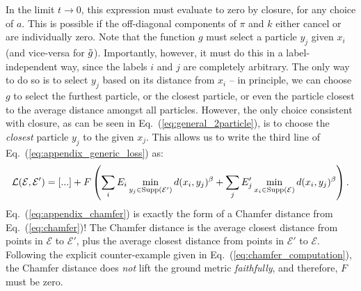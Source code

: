 \documentclass[letterpaper,11pt]{article}
\newcommand{\E}{\mathcal{E}}
\DeclareRobustCommand{\Eq}[1]{Eq.~(\ref{eq:#1})}
\begin{document}
In the limit $t\to0$, this expression must evaluate to zero by closure, for any choice of $a$. This is possible if the off-diagonal components of $\pi$ and $k$ either cancel or are individually zero. Note that the function $g$ must select a particle $y_j$ given $x_i$ (and vice-versa for $\Tilde{g}$). Importantly, however, it must do this in a label-independent way, since the labels $i$ and $j$ are completely arbitrary. The only way to do so is to select $y_j$ based on its distance from $x_i$ -- in principle, we can choose $g$ to select the furthest particle, or the closest particle, or even the particle closest to the average distance amongst all particles. However, the only choice consistent with closure, as can be seen in \Eq{general_2particle}, is to choose the \emph{closest} particle $y_j$ to the given $x_j$. This allows us to write the third line of \Eq{appendix_generic_loss} as:
%
\begin{align}
    \mathcal{L}(\E,\E') = [...] + F\left(\sum_i E_i \min_{y_j\in{\rm Supp}(\E')}d(x_i, y_j)^\beta + \sum_j E_j' \min_{x_i\in{\rm Supp}(\E)}d(x_i, y_j)^\beta\right). \label{eq:appendix_chamfer}
\end{align}
%
\Eq{appendix_chamfer} is exactly the form of a Chamfer distance from \Eq{chamfer}! 
%
The Chamfer distance is the average closest distance from points in $\E$ to $\E'$, plus the average closest distance from points in $\E'$ to $\E$.
%
Following the explicit counter-example given in \Eq{chamfer_computation}, the Chamfer distance does \emph{not} lift the ground metric \emph{faithfully}, and therefore, $F$ must be zero.
\end{document}
